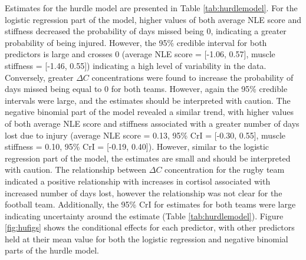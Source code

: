 \documentclass[man,floatsintext]{apa6}
\begin{document}
Estimates for the hurdle model are presented in Table \ref{tab:hurdlemodel}.
For the logistic regression part of the model, higher values of both average NLE score and stiffness decreased the probability of days missed being 0, indicating a greater probability of being injured. However, the 95\% credible interval for both predictors is large and crosses 0 (average NLE score = {[}-1.06, 0.57{]}, muscle stiffness = {[}-1.46, 0.55{]}) indicating a high level of variability in the data.
Conversely, greater \(\Delta C\) concentrations were found to increase the probability of days missed being equal to 0 for both teams.
However, again the 95\% credible intervals were large, and the estimates should be interpreted with caution.
The negative binomial part of the model revealed a similar trend, with higher values of both average NLE score and stiffness associated with a greater number of days lost due to injury (average NLE score = 0.13, 95\% CrI = {[}-0.30, 0.55{]}, muscle stiffness = 0.10, 95\% CrI = {[}-0.19, 0.40{]}).
However, similar to the logistic regression part of the model, the estimates are small and should be interpreted with caution.
The relationship between \(\Delta C\) concentration for the rugby team indicated a positive relationship with increases in cortisol associated with increased number of days lost, however the relationship was not clear for the football team.
Additionally, the 95\% CrI for estimates for both teams were large indicating uncertainty around the estimate (Table \ref{tab:hurdlemodel}).
Figure \ref{fig:hufigs} shows the conditional effects for each predictor, with other predictors held at their mean value for both the logistic regression and negative binomial parts of the hurdle model.
\end{document}
